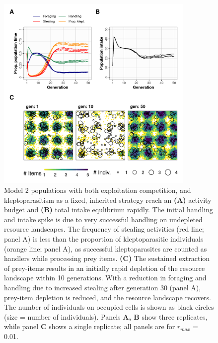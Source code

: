 \documentclass[11pt]{article}
\begin{document}
\begin{figure}[h!]
    \centering
    \includegraphics[width=0.85\textwidth]{figures/fig_03.png}
    \caption{
        Model 2 populations with both exploitation competition, and kleptoparasitism as a fixed, inherited strategy reach an \textbf{(A)} activity budget and \textbf{(B)} total intake equlibrium rapidly.
        The initial handling and intake spike is due to very successful handling on undepleted resource landscapes.
        The frequency of stealing activities (red line; panel A) is less than the proportion of kleptoparasitic individuals (orange line; panel A), as successful kleptoparasites are counted as handlers while processing prey items.
        \textbf{(C)} The sustained extraction of prey-items results in an initially rapid depletion of the resource landscape within 10 generations. 
        With a reduction in foraging and handling due to increased stealing after generation 30 (panel A), prey-item depletion is reduced, and the resource landscape recovers.
        The number of individuals on occupied cells is shown as black circles (size = number of individuals). Panels \textbf{A, B} show three replicates, while panel \textbf{C} shows a single replicate; all panels are for $r_{max}$ = 0.01.
    }
    \label{Fig:Model2}
\end{figure}
\end{document}
